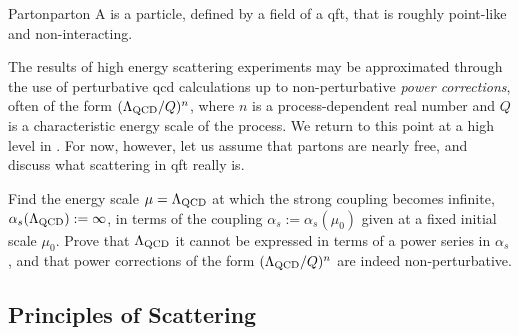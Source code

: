 \begin{definitionbox}{Parton}{parton}
    A  is a particle, defined by a field of a \gls{qft}, that is roughly point-like and non-interacting.
\end{definitionbox}


The results of high energy scattering experiments may be approximated through the use of perturbative \gls{qcd} calculations up to non-perturbative \emph{power corrections}, often of the form \((\Lambda_{\mathrm{QCD}}/Q)^n\), where \(n\) is a process-dependent real number and \(Q\) is a characteristic energy scale of the process.
%
We return to this point at a high level in .
%
For now, however, let us assume that partons are nearly free, and discuss what scattering in \gls{qft} really is.


\begin{exercise}
    \label{ex:lqcd-nonpert}
    Find the energy scale \(\mu = \Lambda_{\mathrm{QCD}}\) at which the strong coupling becomes infinite, \(\alpha_s(\Lambda_{\mathrm{QCD}}) := \infty\), in terms of the coupling \(\alpha_s := \alpha_s(\mu_0)\) given at a fixed initial scale \(\mu_0\).
    Prove that \(\Lambda_{\mathrm{QCD}}\) it cannot be expressed in terms of a power series in \(\alpha_s\), and that power corrections of the form \((\Lambda_{\mathrm{QCD}}/Q)^n\) are indeed non-perturbative.
\end{exercise}




\subsection{Principles of Scattering}
\label{sec:scattering}

